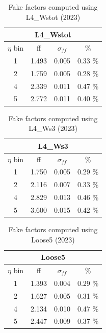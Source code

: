 \begin{minipage}[t]{\textwidth}
  \begin{minipage}[t]{0.32\textwidth}
    \begin{table}[H]
      \centering
      \begin{tabular}{|c|c|c|c|}
        \hline
        \multicolumn{4}{|c|}{\textbf{L4\_Wstot}} \\
        \hline
        $\eta$ bin & ff & $\sigma_{ff}$ & \% \\
        \hline
        1 & 1.493 & 0.005 & 0.33 \% \\
        \hline
        2 & 1.759 & 0.005 & 0.28 \% \\
        \hline
        4 & 2.339 & 0.011 & 0.47 \% \\
        \hline
        5 & 2.772 & 0.011 & 0.40 \% \\
        \hline
      \end{tabular}
      \caption{Fake factors computed using L4\_Wstot (2023)}
    \end{table}
  \end{minipage}
  \begin{minipage}[t]{0.32\textwidth}
    \begin{table}[H]
      \centering
      \begin{tabular}{|c|c|c|c|}
        \hline
        \multicolumn{4}{|c|}{\textbf{L4\_Ws3}} \\
        \hline
        $\eta$ bin & ff & $\sigma_{ff}$ & \% \\
        \hline
        1 & 1.750 & 0.005 & 0.29 \% \\
        \hline
        2 & 2.116 & 0.007 & 0.33 \% \\
        \hline
        4 & 2.829 & 0.013 & 0.46 \% \\
        \hline
        5 & 3.600 & 0.015 & 0.42 \% \\
        \hline
      \end{tabular}
      \caption{Fake factors computed using L4\_Ws3 (2023)}
    \end{table}
  \end{minipage}
  \begin{minipage}[t]{0.32\textwidth}
    \begin{table}[H]
      \centering
      \begin{tabular}{|c|c|c|c|}
        \hline
        \multicolumn{4}{|c|}{\textbf{Loose5}} \\
        \hline
        $\eta$ bin & ff & $\sigma_{ff}$ & \% \\
        \hline
        1 & 1.393 & 0.004 & 0.29 \% \\
        \hline
        2 & 1.627 & 0.005 & 0.31 \% \\
        \hline
        4 & 2.134 & 0.010 & 0.47 \% \\
        \hline
        5 & 2.447 & 0.009 & 0.37 \% \\
        \hline
      \end{tabular}
      \caption{Fake factors computed using Loose5 (2023)}
    \end{table}
  \end{minipage}
  

\end{minipage}
